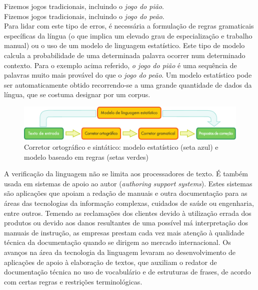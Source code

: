 \begin{multicols}{2}
Fizemos jogos tradicionais, incluindo o \textit{jogo do pião}.\\
Fizemos jogos tradicionais, incluindo o \textit{jogo do peão}.\\

Para lidar com este tipo de erros, é necessária a formulação de regras gramaticais 
específicas da língua (o que implica um elevado grau de especialização e trabalho manual) 
ou o uso de um modelo de linguagem estatístico. Este tipo de modelo calcula a probabilidade 
de uma determinada palavra ocorrer num determinado contexto. 
Para o exemplo acima referido, \textit{o jogo do pião} é uma sequência de palavras muito mais provável 
do que o \textit{jogo do peão}. Um mo\-de\-lo estatístico pode ser automaticamente obtido 
recorrendo-se a uma grande quantidade de dados da língua, que se costuma designar
por um corpus.

\begin{figure}[htb]
  \center
  \includegraphics[width=\textwidth]{../_media/portuguese/language_checking}
  \caption{Corretor ortográfico e sintático: modelo estatístico (seta azul) e modelo baseado em regras (setas verdes)}
  \label{fig:langcheckingaarch_de}
\end{figure}

A verificação da linguagem não se limita aos processadores de texto. 
É também usada em sistemas de apoio ao autor (\textit{authoring support systems}).
Estes sistemas são aplicações que apoiam a redação
de manuais e outra documentação para as áreas das tecnologias da informação complexas, cuidados de saúde ou
engenharia, entre outros.
Temendo as reclamações dos clientes devido à utilização errada dos produtos ou devido aos danos resultantes de uma possível má interpretação dos manuais de instrução, as empresas prestam cada vez mais atenção à qualidade técnica da documentação quando se dirigem ao mercado internacional. 
Os avanços na área da tecnologia da linguagem levaram ao desenvolvimento de aplicações de apoio à elaboração
de textos, que auxiliam o redator de documentação técnica no uso de vocabulário e de estruturas de frases, de acordo com certas regras e restrições terminológicas.



\end{multicols}
